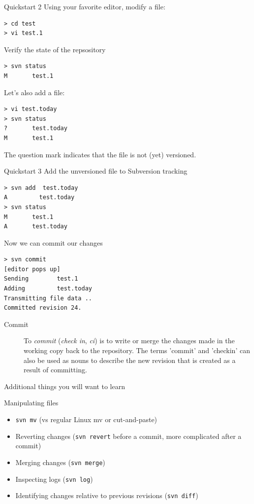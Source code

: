 \documentclass[xcolor=table,compress]{beamer}
\begin{document}
\begin{frame}[fragile]{Quickstart 2}
Using your favorite editor, modify a file:
\color{blue}\begin{lstlisting}
> cd test
> vi test.1
\end{lstlisting}
\pause
\color{black}Verify the state of the repsository\color{blue}
\begin{lstlisting}
> svn status
M       test.1
\end{lstlisting}
\pause\color{black} Let's also add a file:
\color{blue}\begin{lstlisting}
> vi test.today
> svn status
?       test.today
M       test.1
\end{lstlisting}
\color{black}The question mark indicates that the file is not (yet) versioned.
\end{frame}



\begin{frame}[fragile]{Quickstart 3}
Add the unversioned file to Subversion tracking
\begin{lstlisting}
> svn add  test.today
A         test.today
> svn status
M       test.1
A       test.today
\end{lstlisting}
\pause
Now we can commit our changes
\begin{lstlisting}
> svn commit
[editor pops up]
Sending        test.1
Adding         test.today
Transmitting file data ..
Committed revision 24.
\end{lstlisting}
\small
\begin{description}
\item[Commit] 
To \textit{commit} (\textit{check in}, \textit{ci}) is to write or merge the changes made in the working copy back to the repository. The terms 'commit' and 'checkin' can also be used as nouns to describe the new revision that is created as a result of committing.
\end{description}
\end{frame}



\begin{frame}{Additional things you will want to learn}
\begin{block}{Manipulating files}
\begin{itemize}
\item \texttt{svn mv} (vs regular Linux mv or cut-and-paste)
\item Reverting changes (\texttt{svn revert} before a commit, more complicated after a commit)
\item Merging changes (\texttt{svn merge})
\item Inspecting logs (\texttt{svn log})
\item Identifying changes relative to previous revisions (\texttt{svn diff})
\end{itemize}
\end{block}
\end{frame}
\end{document}
